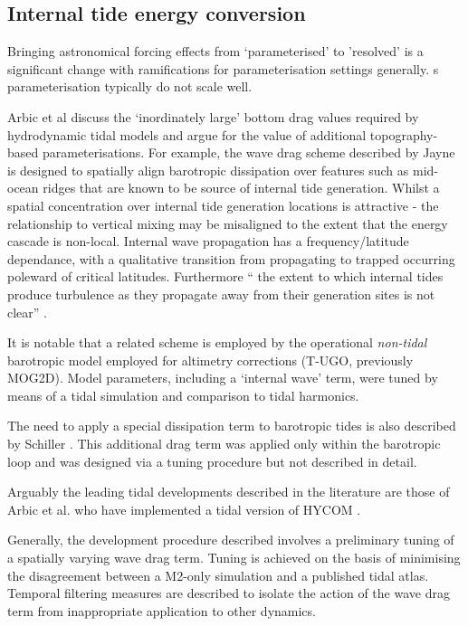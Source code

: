 \subsection{Internal tide energy conversion}

Bringing astronomical forcing effects from `parameterised' to 'resolved' is a significant change with ramifications for parameterisation settings generally. \OGCM{}s parameterisation typically do not scale well.



Arbic et al \cite{Arbic:2004wz} discuss the `inordinately large' bottom drag values required by hydrodynamic tidal models and argue for the value of additional topography-based parameterisations.   
For example, the wave drag scheme described by Jayne \cite{Jayne:2001tr} is designed to spatially align barotropic dissipation over features such as mid-ocean ridges that are known to be source of internal tide generation.  Whilst a spatial concentration over internal tide generation locations is attractive - the relationship to vertical mixing may be misaligned to the extent that the energy cascade is non-local.  Internal wave propagation has a frequency/latitude dependance, with a qualitative transition from propagating to trapped occurring poleward of critical latitudes.  Furthermore `` the extent to which internal tides produce turbulence as they propagate away from their generation sites is not clear'' \citep[pp812]{Jayne:2001tr}.



It is notable that a related scheme is employed by the operational \emph{non-tidal} barotropic model employed for altimetry corrections (T-UGO, previously MOG2D)\citep{Carrere:2003cj}.  Model parameters, including a `internal wave' term, were tuned by means of a tidal simulation and comparison to tidal harmonics. 


The need to apply a special dissipation term to barotropic tides is also described by Schiller \citep[Eq 6]{Schiller:2007gk}.   This additional drag term was applied only within the barotropic loop and was designed via a tuning procedure but not described in detail.



Arguably the leading tidal \OGCM{} developments described in the literature are those of Arbic et al. who have implemented a tidal version of HYCOM \cite{Arbic:2005gv,Arbic:2009hf,Arbic:2010us,Arbic:hy}.

Generally, the development procedure described involves a preliminary tuning of a spatially varying wave drag term.  Tuning is achieved on the basis of minimising the disagreement between a M2-only simulation and a published tidal atlas.   
Temporal filtering measures are described to isolate the action of the wave drag term from inappropriate application to other dynamics. 

